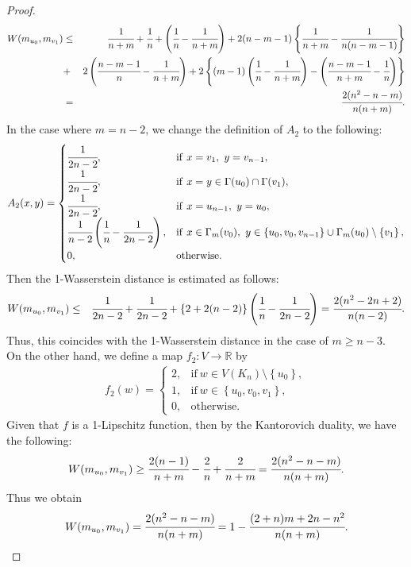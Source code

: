 \documentclass[leqno,12pt]{amsart} %
\theoremstyle{plain} %
\theoremstyle{definition} %
\begin{document}
\begin{proof}
\begin{eqnarray*}
W(m_{u_0}, m_{v_1}) &\leq& \cfrac{1}{n+m} + \cfrac{1}{n} + \left( \cfrac{1}{n} - \cfrac{1}{n+m}\right) + 2(n-m-1) \left\{ \cfrac{1}{n+m} -\cfrac{1}{n(n-m-1)} \right\}\\
&+& 2 \left( \cfrac{n-m-1}{n} - \cfrac{1}{n+m}  \right) + 2 \left\{(m-1) \left(\cfrac{1}{n} - \cfrac{1}{n+m} \right) - \left( \cfrac{n-m-1}{n+m} - \cfrac{1}{n} \right) \right\} \\
&=& \cfrac{2(n^2-n-m)}{n(n+m)}.
\end{eqnarray*}
In the case where $m=n-2$, we change the definition of $A_2$ to the following:
\begin{eqnarray*}
A_2 (x, y)=
\begin{cases}
\cfrac{1}{2n-2}, & \mathrm{if}\ x=v_{1},\ y =v_{n-1},\\
\cfrac{1}{2n-2}, & \mathrm{if}\ x=y \in \Gamma(u_0) \cap \Gamma(v_{1}),\\
\cfrac{1}{2n-2}, & \mathrm{if}\ x =u_{n-1},\ y = u_0,\\
\cfrac{1}{n-2} \left( \cfrac{1}{n} - \cfrac{1}{2n-2} \right), & \mathrm{if}\ x \in \Gamma_m (v_0),\ y \in \left\{u_0, v_0, v_{n-1} \right\} \cup \Gamma_m (u_0) \setminus \left\{ v_1 \right\},\\
0, & \mathrm{otherwise}.
\end{cases}
\end{eqnarray*}
Then the 1-Wasserstein distance is estimated as follows:
\begin{eqnarray*}
W(m_{u_0}, m_{v_1}) &\leq& \cfrac{1}{2n-2} + \cfrac{1}{2n-2} + \left\{ 2+ 2(n-2) \right\} \left( \cfrac{1}{n}- \cfrac{1}{2n-2} \right) =\cfrac{2(n^2 -2n +2)}{n(n-2)}.
\end{eqnarray*}
Thus, this coincides with the 1-Wasserstein distance in the case of $m \geq n-3$.\\

On the other hand, we define a map $f_2 : V \to \mathbb{R}$ by
\begin{eqnarray*}
f_2 (w)=
\begin{cases}
2, & \mathrm{if}\ w \in V(K_n) \setminus \left\{u_{0} \right\},\\
1, & \mathrm{if}\ w \in \left\{u_0, v_0, v_1 \right\},\\
0, & \mathrm{otherwise}.
\end{cases}
\end{eqnarray*}
Given that $f$ is a 1-Lipschitz function, then by the Kantorovich duality, we have the following:
\begin{eqnarray*}
W(m_{u_0}, m_{v_1}) \geq  \cfrac{2(n-1)}{n+m} - \cfrac{2}{n} + \cfrac{2}{n+m} = \cfrac{2(n^2-n-m)}{n(n+m)}.
\end{eqnarray*}
Thus we obtain
\begin{eqnarray*}
W(m_{u_0}, m_{v_1})  = \cfrac{2(n^2-n-m)}{n(n+m)}= 1-\cfrac{(2+n)m + 2n - n^2}{n(n+m)}.
\end{eqnarray*}


\end{proof}
\end{document}
